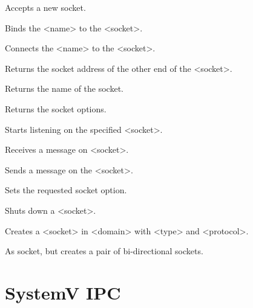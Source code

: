 \begin{enum}{1cm}

Accepts a new socket.

Binds the <name> to the <socket>.

Connects the <name> to the <socket>.

Returns the socket address of the other end of the <socket>.

Returns the name of the socket.

Returns the socket options.

Starts listening on the specified <socket>.

Receives a message on <socket>.

Sends a message on the <socket>.

Sets the requested socket option.

Shuts down a <socket>.

Creates a <socket> in <domain> with <type> and <protocol>.

As socket, but creates a pair of bi-directional sockets.

\end{enum}


\section{SystemV IPC} 

